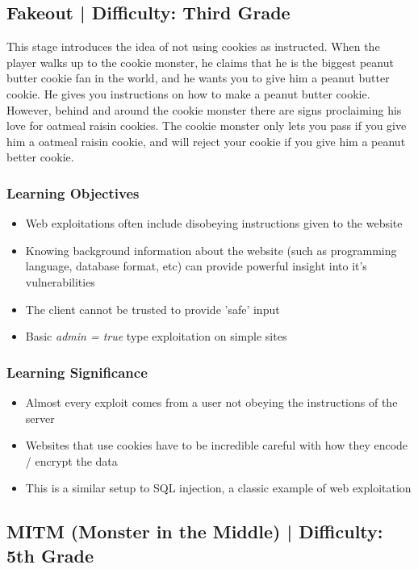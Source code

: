 \documentclass{article}
\begin{document}
\subsection{Fakeout | Difficulty: Third Grade}

This stage introduces the idea of not using cookies as instructed. When the player
walks up to the cookie monster, he claims that he is the biggest
peanut butter cookie fan in the world, and he wants you to give him a
peanut butter cookie. He gives you instructions on how to make a
peanut butter cookie. However, behind and around the cookie monster there are
signs proclaiming his love for oatmeal raisin cookies. The cookie
monster only lets you pass if you give him a oatmeal raisin cookie,
and will reject your cookie if you give him a peanut better cookie. 

\subsubsection{Learning Objectives}

\begin{itemize}
  \item Web exploitations often include disobeying instructions given
    to the website
  \item Knowing background information about the website (such as
    programming language, database format, etc) can provide powerful
    insight into it's vulnerabilities
  \item The client cannot be trusted to provide 'safe' input
  \item Basic \textit{admin = true} type exploitation on simple sites
\end{itemize}

\subsubsection{Learning Significance}

\begin{itemize}
  \item Almost every exploit comes from a user not obeying the
    instructions of the server
  \item Websites that use cookies have to be incredible careful with
    how they encode / encrypt the data
  \item This is a similar setup to SQL injection, a classic example of
    web exploitation
\end{itemize}

\subsection{MITM (Monster in the Middle) | Difficulty: 5th Grade}
\end{document}

